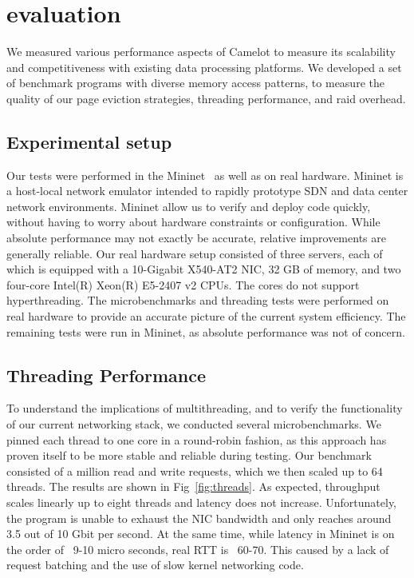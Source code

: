 \section{evaluation}
\label{sec:eval}

We measured various performance aspects of Camelot to measure its
scalability and competitiveness with existing data processing
platforms. We developed a set of benchmark programs with diverse
memory access patterns, to measure the quality of our page eviction
strategies, threading performance, and raid overhead.

\subsection{Experimental setup}
Our tests were performed in the Mininet~\cite{mininet} as well as on real hardware.
Mininet is a host-local network emulator intended to rapidly prototype SDN and data center network environments. Mininet allow us to verify and deploy code quickly, without having to worry about hardware constraints or configuration. While absolute performance may not exactly be accurate, relative improvements are generally reliable. 
Our real hardware setup consisted of three servers, each of which is equipped with a 10-Gigabit X540-AT2 NIC, 32 GB of memory, and two four-core Intel(R) Xeon(R) E5-2407 v2 CPUs. The cores do not support hyperthreading.
The microbenchmarks and threading tests were performed on real hardware to provide an accurate picture of the current system efficiency. The remaining tests were run in Mininet, as absolute performance was not of concern.

\subsection{Threading Performance}
To understand the implications of multithreading, and to verify the functionality of our current networking stack, we conducted several microbenchmarks. We pinned each thread to one core in a round-robin fashion, as this approach has proven itself to be more stable and reliable during testing. Our benchmark consisted of a million read and write requests, which we then scaled up to 64 threads. The results are shown in Fig~\ref{fig:threads}.
As expected, throughput scales linearly up to eight threads and latency does not increase. Unfortunately, the program is unable to exhaust the NIC bandwidth and only reaches around 3.5 out of 10 Gbit per second. At the same time, while latency in Mininet is on the order of ~9-10 micro seconds, real RTT is ~60-70. This caused by a lack of request batching and the use of slow kernel networking code.

